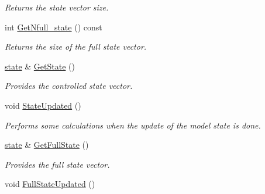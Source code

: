\documentclass{tufte-book}
\begin{document}
\begin{DoxyCompactItemize}
\begin{DoxyCompactList}\small\item\em \-Returns the state vector size. \end{DoxyCompactList}\item
int \hyperlink{class_verdandi_1_1_model_template_af4834669228239d8b3e6c07dc8175cce}{\-Get\-Nfull\-\_\-state} () const
\begin{DoxyCompactList}\small\item\em \-Returns the size of the full state vector. \end{DoxyCompactList}\item
\hyperlink{class_verdandi_1_1_model_template_a6bb9efb7898f067bb21780159b497ba7}{state} \& \hyperlink{class_verdandi_1_1_model_template_ae014bde61361001da52aab36d89f0048}{\-Get\-State} ()
\begin{DoxyCompactList}\small\item\em \-Provides the controlled state vector. \end{DoxyCompactList}\item
\hypertarget{class_verdandi_1_1_model_template_a885248c5bbe5a173277a551b3f253277}{
void \hyperlink{class_verdandi_1_1_model_template_a885248c5bbe5a173277a551b3f253277}{\-State\-Updated} ()}
\label{class_verdandi_1_1_model_template_a885248c5bbe5a173277a551b3f253277}

\begin{DoxyCompactList}\small\item\em \-Performs some calculations when the update of the model state is done. \end{DoxyCompactList}\item
\hyperlink{class_verdandi_1_1_model_template_a6bb9efb7898f067bb21780159b497ba7}{state} \& \hyperlink{class_verdandi_1_1_model_template_a9335ddd8893b9d69e07b488100aee1bd}{\-Get\-Full\-State} ()
\begin{DoxyCompactList}\small\item\em \-Provides the full state vector. \end{DoxyCompactList}\item
\hypertarget{class_verdandi_1_1_model_template_acf994c6ae52551dd1da95d6bdfcb9b01}{
void \hyperlink{class_verdandi_1_1_model_template_acf994c6ae52551dd1da95d6bdfcb9b01}{\-Full\-State\-Updated} ()}
\label{class_verdandi_1_1_model_template_acf994c6ae52551dd1da95d6bdfcb9b01}


\end{DoxyCompactItemize}
\end{document}
